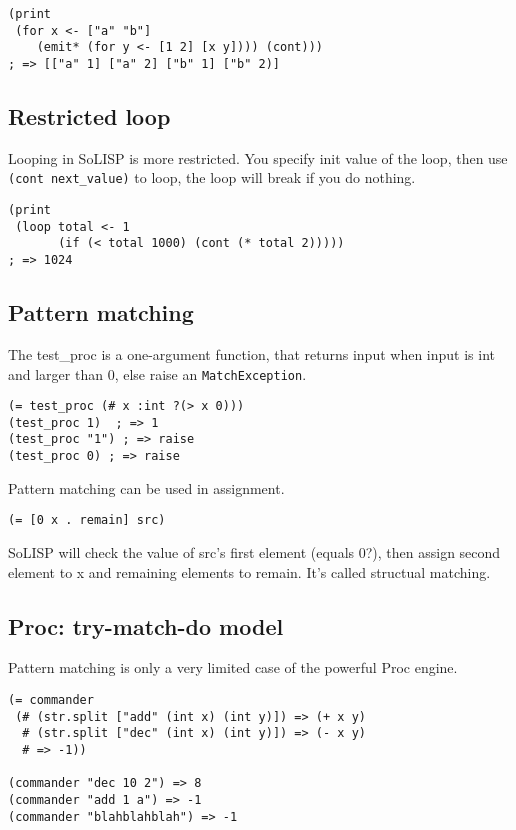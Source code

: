 \documentclass[a4paper,11pt]{article}
\begin{document}
\begin{verbatim}
(print
 (for x <- ["a" "b"]
    (emit* (for y <- [1 2] [x y]))) (cont)))
; => [["a" 1] ["a" 2] ["b" 1] ["b" 2)]
\end{verbatim}


\subsection{Restricted loop}

Looping in SoLISP is more restricted. You specify init value of the loop, then use \verb|(cont next_value)| to loop, the loop will break if you do nothing.

\begin{verbatim}
(print
 (loop total <- 1
       (if (< total 1000) (cont (* total 2)))))
; => 1024
\end{verbatim}

\subsection{Pattern matching}

The test\_proc is a one-argument function, that returns input when input is int and larger than 0, else raise an \verb|MatchException|.

\begin{verbatim}
(= test_proc (# x :int ?(> x 0)))
(test_proc 1)  ; => 1
(test_proc "1") ; => raise
(test_proc 0) ; => raise
\end{verbatim}

Pattern matching can be used in assignment.

\begin{verbatim}
(= [0 x . remain] src)
\end{verbatim}

SoLISP will check the value of src's first element (equals 0?), then assign second element to x and remaining elements to remain. It's called structual matching.

\subsection{Proc: try-match-do model}

Pattern matching is only a very limited case of the powerful Proc engine.

\begin{verbatim}
(= commander
 (# (str.split ["add" (int x) (int y)]) => (+ x y)
  # (str.split ["dec" (int x) (int y)]) => (- x y)
  # => -1))

(commander "dec 10 2") => 8
(commander "add 1 a") => -1
(commander "blahblahblah") => -1
\end{verbatim}
\end{document}

